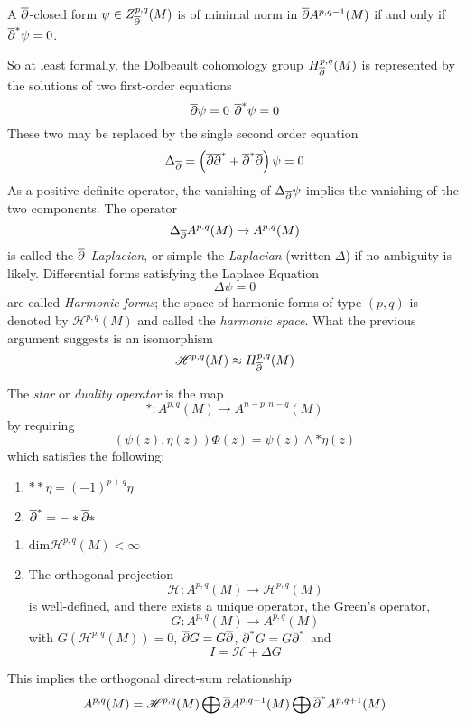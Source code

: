 \begin{lem}

	A $\overline{\partial}$-closed form $ \psi \in Z^{ p,q }_{ \overline{\partial} }(M)$ is of minimal norm in $ \overline{\partial} A^{ p,q-1 }(M)$ if and only if $ \overline{\partial}^* \psi = 0$.

\end{lem}

So at least formally, the Dolbeault cohomology group $ H^{ p,q }_{ \overline{\partial} }(M)$ is represented by the solutions of two first-order equations
\[
\overline{\partial} \psi = 0 \hspace{4pt} \overline{\partial}^* \psi = 0
\]
These two may be replaced by the single second order equation
\[
	\Delta_{ \overline{\partial} } = \left( \overline{\partial} \overline{\partial}^* + \overline{\partial}^* \overline{\partial} \right) \psi = 0
\]
As a positive definite operator, the vanishing of $ \Delta_{ \overline{\partial} } \psi$ implies the vanishing of the two components. The operator
\[
	\Delta_{ \overline{\partial} } A^{ p,q }(M) \to A^{ p,q }(M)
\]
is called the \textit{$\overline{\partial}$-Laplacian}, or simple the \textit{Laplacian} (written $ \Delta$) if no ambiguity is likely. Differential forms satisfying the Laplace Equation
\[
\Delta \psi = 0
\]
are called \textit{Harmonic forms}; the space of harmonic forms of type $ \left( p,q \right)$ is denoted by $ \mathscr{H}^{ p,q }(M)$ and called the \textit{harmonic space}. What the previous argument suggests is an isomorphism
\[
	\mathscr{H}^{ p,q }(M) \approx H^{ p,q }_{ \overline{\partial} }(M)
\]

\begin{defn}

The \textit{star} or \textit{duality operator} is the map
\[
	*: A^{ p,q }(M) \to A^{ n-p, n-q }(M)
\]
by requiring
\[
	\left( \psi(z), \eta(z) \right) \Phi(z) = \psi(z) \wedge * \eta(z)
\]
which satisfies the following:
\begin{enumerate}
	\item $ ** \eta = (-1)^{ p+q } \eta$
	\item $ \overline{\partial}^* = - * \overline{\partial} *$
\end{enumerate}


\end{defn}

\begin{thm}

\begin{enumerate}
	\item $ \mathrm{dim} \mathscr{H}^{ p,q }(M) < \infty$
	\item The orthogonal projection
		\[
			\mathscr{H}: A^{ p,q }(M) \to \mathscr{H}^{ p,q }(M)
		\]
		is well-defined, and there exists a unique operator, the Green's operator,
		\[
			G: A^{ p,q }(M) \to A^{ p,q }(M)
		\]
		with $ G( \mathscr{H}^{ p,q }(M)) = 0$, $\overline{\partial} G = G \overline{\partial}$, $ \overline{\partial}^* G = G \overline{\partial}^*$ and
		\[
		I = \mathscr{H} + \Delta G
		\]
		
\end{enumerate}

This implies the orthogonal direct-sum relationship
\[
	A^{ p,q }(M) = \mathscr{H}^{ p,q }(M) \bigoplus \overline{\partial} A^{ p,q-1 }(M) \bigoplus \overline{\partial}^* A^{ p,q+1 }(M)
\]


\end{thm}

